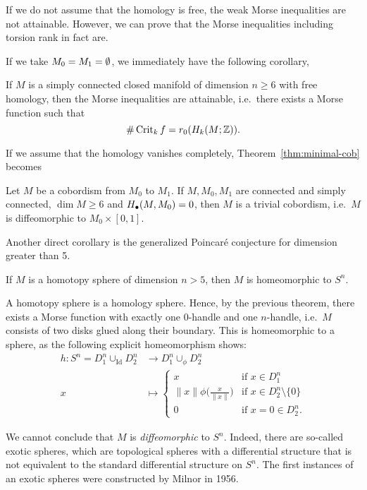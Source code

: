 \begin{remark}
    If we do not assume that the homology is free, the weak Morse inequalities are not attainable.
    However, we can prove that the Morse inequalities including torsion rank in fact are.
\end{remark}

If we take $ M_0 = M_1 = \emptyset$, we immediately have the following corollary,
\begin{corollary}
    If $M$ is a simply connected closed manifold of dimension  $n \ge 6$ with free homology, then the Morse inequalities are attainable, i.e.\ there exists a Morse function such that
    \[
        \# \operatorname{Crit}_kf = r_0 (H_k(M; \mathbb{Z}))
    .\] 
\end{corollary}

If we assume that the homology vanishes completely,
Theorem~\ref{thm:minimal-cob} becomes
\begin{corollary}
    Let $M$ be a cobordism from  $M_0$ to $M_1$.
    If $M, M_0, M_1$ are connected and simply connected, $\dim M \ge  6$ and $H_{\bullet}(M, M_0) = 0$, then $M$ is a trivial cobordism, i.e.\ $M$ is diffeomorphic to $M_0 \times [0,1]$.
\end{corollary}

Another direct corollary is the generalized Poincaré conjecture for dimension greater than 5.

\begin{corollary}
    If $M$ is a homotopy sphere of dimension  $n >  5$, then $M$ is homeomorphic to  $S^{n}$.
\end{corollary}
\begin{myproof}
    A homotopy sphere is a homology sphere.
    Hence, by the previous theorem, there exists a Morse function with exactly one $0$-handle and one $n$-handle, i.e.\ $M$ consists of two disks glued along their boundary. This is homeomorphic to a sphere, as the following explicit homeomorphism shows:
    \begin{align*}
        h: S^{n} = D_1^{n} \cup_\text{Id}  D_2^{n} &\longrightarrow D_1^{n} \cup_\phi D_2^{n} \\
         x &\longmapsto 
         \begin{cases}
             x & \text{if $x \in D_1^{n}$}\\
             \|x\| \phi\Big(\frac{x}{\|x\|}\Big) & \text{if $x \in D_2 ^{n} \setminus \{0\} $}\\
             0 & \text{if $x = 0 \in D_2^{n}$.} 
         \end{cases}
    \end{align*}
\end{myproof}
\begin{remark}
    We cannot conclude that $M$ is \emph{diffeomorphic} to $S^{n}$.
    Indeed, there are so-called exotic spheres, which are topological spheres with a differential structure that is not equivalent to the standard differential structure on $S^{n}$.
    The first instances of an exotic spheres were constructed by Milnor in 1956.
\end{remark}

